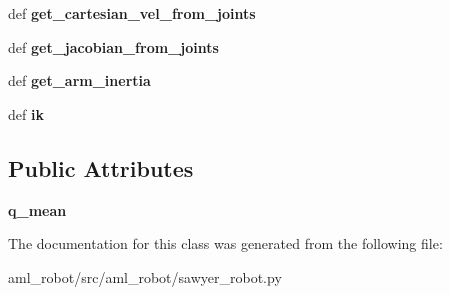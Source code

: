 \begin{DoxyCompactItemize}
\item 
\hypertarget{classaml__robot_1_1sawyer__robot_1_1_sawyer_arm_abd2c9c259424ea67eb10756d26b983f2}{def {\bfseries get\-\_\-cartesian\-\_\-vel\-\_\-from\-\_\-joints}}\label{classaml__robot_1_1sawyer__robot_1_1_sawyer_arm_abd2c9c259424ea67eb10756d26b983f2}

\item 
\hypertarget{classaml__robot_1_1sawyer__robot_1_1_sawyer_arm_a14bebadaa6a308b4207a9e9eae1b3c3a}{def {\bfseries get\-\_\-jacobian\-\_\-from\-\_\-joints}}\label{classaml__robot_1_1sawyer__robot_1_1_sawyer_arm_a14bebadaa6a308b4207a9e9eae1b3c3a}

\item 
\hypertarget{classaml__robot_1_1sawyer__robot_1_1_sawyer_arm_aef8f0c5bfc56aa39ead293628350b014}{def {\bfseries get\-\_\-arm\-\_\-inertia}}\label{classaml__robot_1_1sawyer__robot_1_1_sawyer_arm_aef8f0c5bfc56aa39ead293628350b014}

\item 
\hypertarget{classaml__robot_1_1sawyer__robot_1_1_sawyer_arm_a00ba867aecd31394496cf8fd4fc33e6a}{def {\bfseries ik}}\label{classaml__robot_1_1sawyer__robot_1_1_sawyer_arm_a00ba867aecd31394496cf8fd4fc33e6a}

\end{DoxyCompactItemize}
\subsection*{Public Attributes}
\begin{DoxyCompactItemize}
\item 
\hypertarget{classaml__robot_1_1sawyer__robot_1_1_sawyer_arm_a51e9b0803b6a2ec92bc01115746ad4f7}{{\bfseries q\-\_\-mean}}\label{classaml__robot_1_1sawyer__robot_1_1_sawyer_arm_a51e9b0803b6a2ec92bc01115746ad4f7}

\end{DoxyCompactItemize}


The documentation for this class was generated from the following file\-:\begin{DoxyCompactItemize}
\item 
aml\-\_\-robot/src/aml\-\_\-robot/sawyer\-\_\-robot.\-py\end{DoxyCompactItemize}
